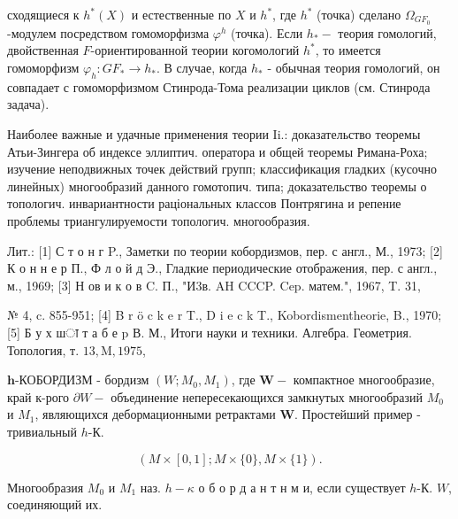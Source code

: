 \documentclass[10pt]{article}
\begin{document}
сходящиеся к $h^{*}(X)$ и естественные по $X$ и $h^{*}$, где $h^{*}$ (точка) сделано $\Omega_{G F_{0}}$-модулем посредством гомоморфизма $\varphi^{h}$ (точка). Если $h_{*}-$ теория гомологий, двойственная $F$-ориентированной теории когомологий $h^{*}$, то имеется гомоморфизм $\varphi_{h}: G F_{*} \rightarrow h_{*}$. В случае, когда $h_{*}$ - обычная теория гомологий, он совпадает с гомоморфизмом Стинрода-Тома реализации циклов (см. Стинрода задача).



Наиболее важные и удачные применения теории Ii.: доказательство теоремы Атьи-Зингера об индексе эллиптич. оператора и общей теоремы Римана-Роха; изучение неподвижных точек действий групп; классификация гладких (кусочно линейных) многообразий данного гомотопич. типа; доказательство теоремы о топологич. инвариантности раціональных классов Понтрягина и репение проблемы триангулируемости топологич. многообразия.



Лит.: [1] С т о н г P., Заметки по теории кобордизмов, пер. с англ., М., 1973; [2] К о н н е р П., Ф л о й д Э., Гладкие периодические отображения, пер. с англ., м., 1969; [3] Н ов и к о в C. П., "И3в. AH CCCP. Cep. матем.", 1967, T. 31,

№ 4, c. 855-951; [4] B r ö c k e r T., D i e c k T., Kobordismentheorie, B., 1970; [5] Б у х шा т а б е p В. М., Итоги науки и техники. Алгебра. Геометрия. Топология, т. $13, \mathrm{M}, 1975$,



$\boldsymbol{h}$-КОБОРДИЗМ - бордизм $\left(W ; M_{0}, M_{1}\right)$, где $\boldsymbol{W}-$ компактное многообразие, край к-рого $\partial W-$ объединение непересекающихся замкнутых многообразий $M_{0}$ и $M_{1}$, являющихся дебормационными ретрактами $\boldsymbol{W}$. Простейший пример - тривиальный $h$-К.



\[

(M \times[0,1] ; M \times\{0\}, M \times\{1\}) .

\]



Многообразия $M_{0}$ и $M_{1}$ наз. $h-\kappa$ о б о р д а н т н м и, если существует $h$-К. $W$, соединяющий их.
\end{document}
